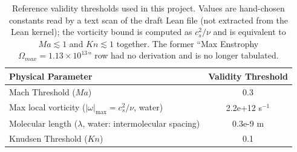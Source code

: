 \begin{table}[h]
\centering
\begin{tabular}{|l|c|}
\hline
\textbf{Physical Parameter} & \textbf{Validity Threshold} \\
\hline
Mach Threshold ($Ma$) & 0.3 \\
Max local vorticity ($|\omega|_{\max} = c_s^2/\nu$, water) & 2.2e+12 s$^{-1}$ \\
Molecular length ($\lambda$, water: intermolecular spacing) & 0.3e-9 m \\
Knudsen Threshold ($Kn$) & 0.1 \\
\hline
\end{tabular}
\caption{Reference validity thresholds used in this project. Values are hand-chosen constants read by a text scan of the draft Lean file (not extracted from the Lean kernel); the vorticity bound is computed as $c_s^2/\nu$ and is equivalent to $Ma \lesssim 1$ and $Kn \lesssim 1$ together. The former ``Max Enstrophy $\Omega_{max} = 1.13\times10^{13}$'' row had no derivation and is no longer tabulated.}
\label{tab:physlib_limits}
\end{table}
